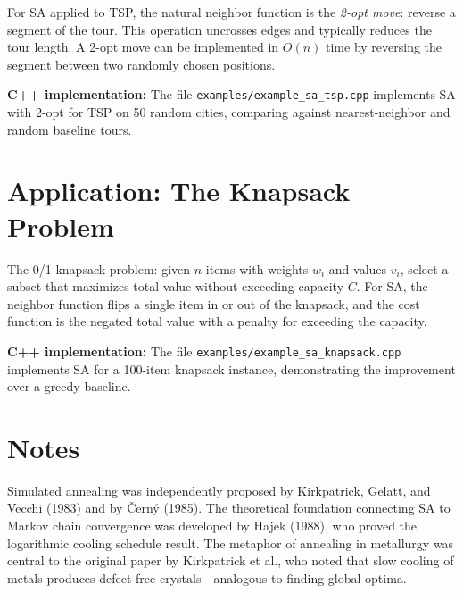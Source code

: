 \documentclass[twoside,12pt]{book}
\theoremstyle{plain}
\theoremstyle{definition}
\theoremstyle{remark}
\newenvironment{cpplisting}{\begin{center}\small}{\end{center}}
\begin{document}
For SA applied to TSP, the natural neighbor function is the \emph{2-opt move}: reverse a segment of the tour. This operation uncrosses edges and typically reduces the tour length. A 2-opt move can be implemented in $O(n)$ time by reversing the segment between two randomly chosen positions.

\begin{cpplisting}
\textbf{C++ implementation:} The file \texttt{examples/example\_sa\_tsp.cpp} implements SA with 2-opt for TSP on 50 random cities, comparing against nearest-neighbor and random baseline tours.
\end{cpplisting}

\section{Application: The Knapsack Problem}
\label{sec:sa-knapsack}

The 0/1 knapsack problem: given $n$ items with weights $w_i$ and values $v_i$, select a subset that maximizes total value without exceeding capacity $C$. For SA, the neighbor function flips a single item in or out of the knapsack, and the cost function is the negated total value with a penalty for exceeding the capacity.

\begin{cpplisting}
\textbf{C++ implementation:} The file \texttt{examples/example\_sa\_knapsack.cpp} implements SA for a 100-item knapsack instance, demonstrating the improvement over a greedy baseline.
\end{cpplisting}

\section*{Notes}

Simulated annealing was independently proposed by Kirkpatrick, Gelatt, and Vecchi (1983) and by \v{C}ern\'{y} (1985). The theoretical foundation connecting SA to Markov chain convergence was developed by Hajek (1988), who proved the logarithmic cooling schedule result. The metaphor of annealing in metallurgy was central to the original paper by Kirkpatrick et al., who noted that slow cooling of metals produces defect-free crystals---analogous to finding global optima.
\end{document}
